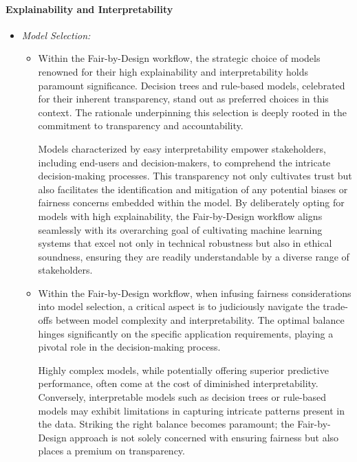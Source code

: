 \paragraph{Explainability and Interpretability}

\begin{itemize}

    \item \emph{Model Selection:}

    \begin{itemize}

        \item Within the Fair-by-Design workflow, the strategic choice of models renowned for their high explainability and interpretability holds paramount significance. Decision trees and rule-based models, celebrated for their inherent transparency, stand out as preferred choices in this context. The rationale underpinning this selection is deeply rooted in the commitment to transparency and accountability.

        Models characterized by easy interpretability empower stakeholders, including end-users and decision-makers, to comprehend the intricate decision-making processes. This transparency not only cultivates trust but also facilitates the identification and mitigation of any potential biases or fairness concerns embedded within the model. By deliberately opting for models with high explainability, the Fair-by-Design workflow aligns seamlessly with its overarching goal of cultivating machine learning systems that excel not only in technical robustness but also in ethical soundness, ensuring they are readily understandable by a diverse range of stakeholders.

        \item Within the Fair-by-Design workflow, when infusing fairness considerations into model selection, a critical aspect is to judiciously navigate the trade-offs between model complexity and interpretability. The optimal balance hinges significantly on the specific application requirements, playing a pivotal role in the decision-making process.

        Highly complex models, while potentially offering superior predictive performance, often come at the cost of diminished interpretability. Conversely, interpretable models such as decision trees or rule-based models may exhibit limitations in capturing intricate patterns present in the data. Striking the right balance becomes paramount; the Fair-by-Design approach is not solely concerned with ensuring fairness but also places a premium on transparency.
        

\end{itemize}
\end{itemize}

